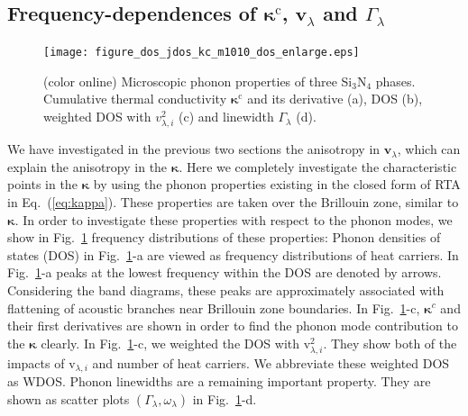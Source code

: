 \documentclass[twocolumn,amsmath,amssymb,a4paper,prb,superscriptaddress,floatfix]{revtex4-1}
\begin{document}
\subsection{Frequency-dependences of $\boldsymbol{\kappa}^\text{c}$, $\mathbf{v}$$_\lambda$ and $\Gamma_\lambda$}

\begin{figure}[ht]
 \begin{center}
  \texttt{[image: figure\_dos\_jdos\_kc\_m1010\_dos\_enlarge.eps]}
  \caption{(color online) Microscopic phonon properties of three Si$_3$N$_4$
	  phases. Cumulative thermal conductivity $\mathbf{\kappa}^\text{c}$ and its derivative
	  (a), DOS (b), weighted DOS with $v_{\lambda,i}^2$ (c) and linewidth $\Gamma_\lambda$ (d).
  \label{fig:Fig5_338_rev} }
 \end{center}
\end{figure}

We have investigated in the previous two sections the anisotropy in
$\mathbf{v}_\lambda$, which can explain the anisotropy in the
$\boldsymbol{\kappa}$. Here we completely investigate the characteristic points
in the $\boldsymbol{\kappa}$ by using the phonon properties existing in the
closed form of RTA in Eq.~(\ref{eq:kappa}). These properties are taken over the
Brillouin zone, similar to $\boldsymbol{\kappa}$.  In order to investigate these
properties with respect to the phonon modes, we show in
Fig.~\ref{fig:Fig5_338_rev} frequency distributions of these properties: Phonon
densities of states (DOS) in Fig.~\ref{fig:Fig5_338_rev}-a are viewed as frequency
distributions of heat carriers.  In Fig.~\ref{fig:Fig5_338_rev}-a peaks at the
lowest frequency within the DOS are denoted by arrows. Considering the band
diagrams, these peaks are approximately associated with flattening of acoustic
branches near Brillouin zone boundaries.
In Fig.~\ref{fig:Fig5_338_rev}-c, $\boldsymbol{\kappa}^c$ and their first
derivatives are shown in order to find the phonon mode contribution to the
$\boldsymbol{\kappa}$ clearly. In Fig.~\ref{fig:Fig5_338_rev}-c, we weighted the
DOS with \rm{v}$_{\lambda,i}^2$. They show both of the impacts of
\rm{v}$_{\lambda,i}$ and number of heat carriers. We abbreviate these weighted
DOS as WDOS. Phonon linewidths are a remaining important property.  They are
shown as scatter plots $(\Gamma_\lambda, \omega_\lambda)$ in
Fig.~\ref{fig:Fig5_338_rev}-d. 
\end{document}
